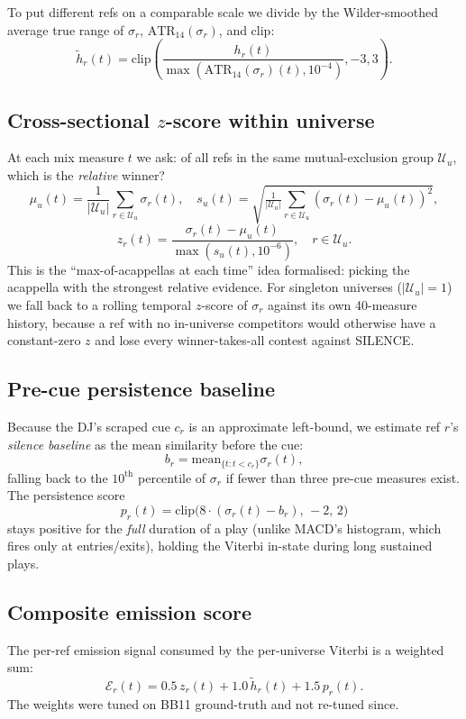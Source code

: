 \documentclass[11pt,a4paper]{article}
\begin{document}
To put different refs on a comparable scale we divide by the Wilder-smoothed average true range of $\sigma_r$, $\text{ATR}_{14}(\sigma_r)$, and clip:
\[
\tilde h_r(t) = \text{clip}\!\left(\frac{h_r(t)}{\max(\text{ATR}_{14}(\sigma_r)(t), 10^{-4})}, -3, 3\right).
\]

\subsection{Cross-sectional $z$-score within universe}

At each mix measure $t$ we ask: of all refs in the same mutual-exclusion group $\mathcal{U}_u$, which is the \emph{relative} winner?
\[
\mu_u(t) = \frac{1}{|\mathcal{U}_u|}\sum_{r \in \mathcal{U}_u}\sigma_r(t), \quad
s_u(t) = \sqrt{\tfrac{1}{|\mathcal{U}_u|}\sum_{r \in \mathcal{U}_u}(\sigma_r(t) - \mu_u(t))^2},
\]
\[
z_r(t) = \frac{\sigma_r(t) - \mu_u(t)}{\max(s_u(t), 10^{-6})}, \quad r \in \mathcal{U}_u.
\]
This is the ``max-of-acappellas at each time'' idea formalised: picking the acappella with the strongest relative evidence. For singleton universes ($|\mathcal{U}_u| = 1$) we fall back to a rolling temporal $z$-score of $\sigma_r$ against its own 40-measure history, because a ref with no in-universe competitors would otherwise have a constant-zero $z$ and lose every winner-takes-all contest against SILENCE.

\subsection{Pre-cue persistence baseline}

Because the DJ's scraped cue $c_r$ is an approximate left-bound, we estimate ref $r$'s \emph{silence baseline} as the mean similarity before the cue:
\[
b_r = \text{mean}_{\{t : t < c_r\}}\sigma_r(t),
\]
falling back to the $10^\text{th}$ percentile of $\sigma_r$ if fewer than three pre-cue measures exist. The persistence score
\[
p_r(t) = \text{clip}\!\big(8 \cdot (\sigma_r(t) - b_r),\, -2,\, 2\big)
\]
stays positive for the \emph{full} duration of a play (unlike MACD's histogram, which fires only at entries/exits), holding the Viterbi in-state during long sustained plays.

\subsection{Composite emission score}

The per-ref emission signal consumed by the per-universe Viterbi is a weighted sum:
\begin{equation}
\mathcal{E}_r(t) = 0.5\,z_r(t) + 1.0\,\tilde h_r(t) + 1.5\,p_r(t).
\end{equation}
The weights were tuned on BB11 ground-truth and not re-tuned since.
\end{document}
